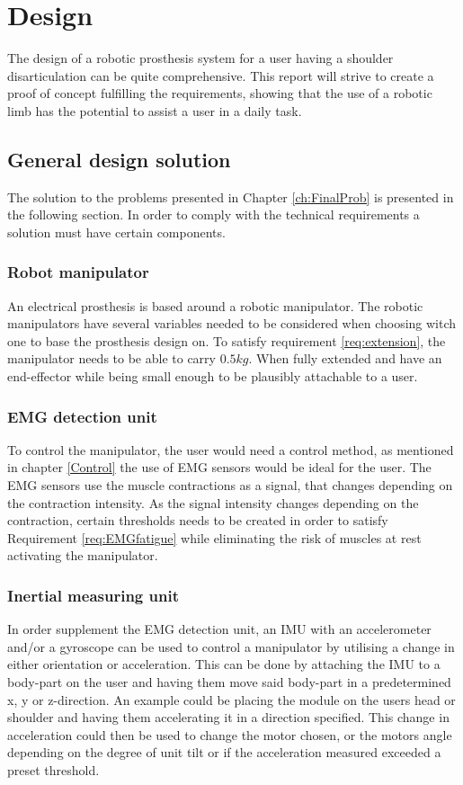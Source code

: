 \chapter{Design}\label{ch:Design} %
The design of a robotic prosthesis system for a user having a shoulder disarticulation can be quite comprehensive. This report will strive to create a proof of concept fulfilling the requirements, showing that the use of a robotic limb has the potential to assist a user in a daily task.

\section{General design solution}
The solution to the problems presented in Chapter \ref{ch:FinalProb} is presented in the following section. In order to comply with the technical requirements a solution must have certain components.

\subsection*{Robot manipulator}
An electrical prosthesis is based around a robotic manipulator. The robotic manipulators have several variables needed to be considered when choosing witch one to base the prosthesis design on. To satisfy requirement \ref{req:extension}, the manipulator needs to be able to carry $0.5 kg$. When fully extended and have an end-effector while being small enough to be plausibly attachable to a user.

\subsection*{EMG detection unit}
To control the manipulator, the user would need a control method, as mentioned in chapter \ref{Control} the use of EMG sensors would be ideal for the user. The EMG sensors use the muscle contractions as a signal, that changes depending on the contraction intensity. As the signal intensity changes depending on the contraction, certain thresholds needs to be created in order to satisfy Requirement \ref{req:EMGfatigue} while eliminating the risk of  muscles at rest activating the manipulator. 


\subsection*{Inertial measuring unit}%
 In order supplement the EMG detection unit, an IMU with an accelerometer and/or a gyroscope can be used to control a manipulator by utilising a change in either orientation or acceleration. This can be done by attaching the IMU to a body-part on the user and having them move said body-part in a predetermined x, y or z-direction. An example could be placing the module on the users head or shoulder and having them accelerating it in a direction specified. This change in acceleration could then be used to change the motor chosen, or the motors angle depending on the degree of unit tilt or if the acceleration measured exceeded a preset threshold.

